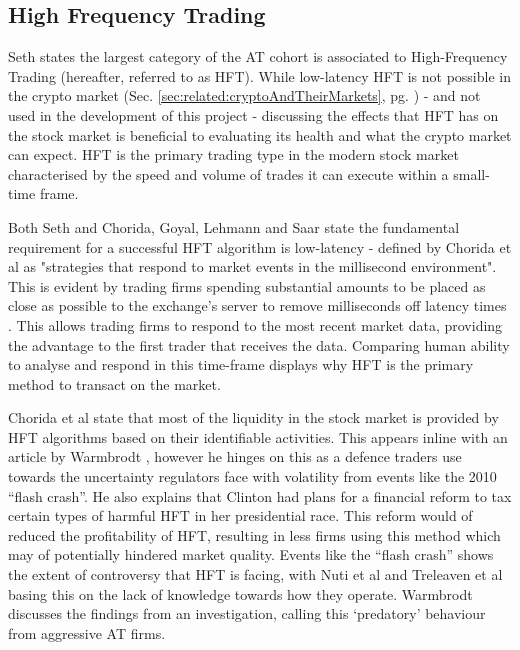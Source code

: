 \subsection{High Frequency Trading}
\label{sec:related:algoTrading:HFT}
\noindent  Seth \cite{WEB:SETH:0001} states the largest category of the AT cohort is associated to High-Frequency Trading (hereafter, referred to as HFT). While low-latency HFT is not possible in the crypto market (Sec. \ref{sec:related:cryptoAndTheirMarkets}, pg. \pageref{sec:related:cryptoAndTheirMarkets}) - and not used in the development of this project - discussing the effects that HFT has on the stock market is beneficial to evaluating its health and what the crypto market can expect. HFT is the primary trading type in the modern stock market characterised by the speed and volume of trades it can execute within a small-time frame.

Both Seth \cite{WEB:SETH:0001} and Chorida, Goyal, Lehmann and Saar \cite{REPORT:ChordiaEtAl:2013} state the fundamental requirement for a successful HFT algorithm is low-latency - defined by Chorida et al as "strategies that respond to market events in the millisecond environment". This is evident by trading firms spending substantial amounts to be placed as close as possible to the exchange's server to remove milliseconds off latency times \cite{ART:Aswani:2016}. This allows trading firms to respond to the most recent market data, providing the advantage to the first trader that receives the data. Comparing human ability to analyse and respond in this time-frame displays why HFT is the primary method to transact on the market.

Chorida et al \cite{REPORT:ChordiaEtAl:2013} state that most of the liquidity in the stock market is provided by HFT algorithms based on their identifiable activities. This appears inline with an article by Warmbrodt \cite{ART:Warmbrodt:2016}, however he hinges on this as a defence traders use towards the uncertainty regulators face with volatility from events like the 2010 ``flash crash''. He also explains that Clinton had plans for a financial reform to tax certain types of harmful HFT in her presidential race. This reform would of reduced the profitability of HFT, resulting in less firms using this method which may of potentially hindered market quality. Events like the ``flash crash'' shows the extent of controversy that HFT is facing, with Nuti et al \cite{ART:Nuti:2011} and Treleaven et al \cite{ART:Treleaven:2013} basing this on the lack of knowledge towards how they operate. Warmbrodt \cite{ART:Warmbrodt:2016} discusses the findings from an investigation, calling this `predatory' behaviour from aggressive AT firms. 

